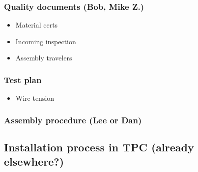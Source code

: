 \subsubsection{Quality documents (Bob, Mike Z.)}

\begin{itemize}
\item{Material certs}
\item{Incoming inspection}
\item{Assembly travelers}
\end{itemize}

\subsubsection{Test plan}

\begin{itemize}
\item{Wire tension}
\end{itemize}

\subsubsection{Assembly procedure (Lee or Dan)}

\subsection{Installation process in TPC (already elsewhere?)}
